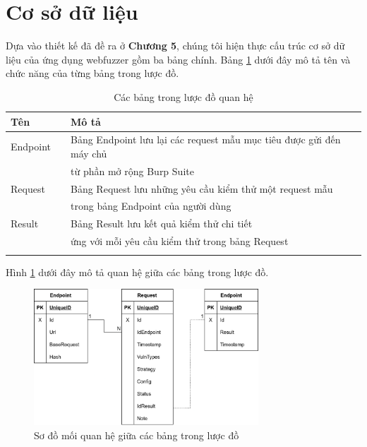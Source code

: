 \section{Cơ sở dữ liệu}
Dựa vào thiết kế đã đề ra ở \textbf{Chương 5}, chúng tôi hiện thực cấu trúc cơ sở dữ liệu của ứng dụng webfuzzer gồm ba bảng chính. Bảng \ref{tab:db-tables} dưới đây mô tả tên và chức năng của từng bảng trong lược đồ.
\begin{table}[ht]
    \centering
    \caption{Các bảng trong lược đồ quan hệ}
    \label{tab:db-tables}
    \begin{tabular}[ht]{lll}
        \toprule[1pt]\midrule[0.3pt]
            \textbf{Tên}& &\textbf{Mô tả}\\ 
        \midrule
            Endpoint& &Bảng Endpoint lưu lại các request mẫu mục tiêu được gửi đến máy chủ \\
            {}& &từ phần mở rộng Burp Suite\\
            \addlinespace
            Request& &Bảng Request lưu những yêu cầu kiểm thử một request mẫu \\
            {}& &trong bảng Endpoint của người dùng\\
            \addlinespace
            Result& &Bảng Result lưu kết quả kiểm thử chi tiết \\
            {}& &ứng với mỗi yêu cầu kiểm thử trong bảng Request\\
            \addlinespace
        \midrule[0.3pt]\bottomrule[1pt]
    \end{tabular}
\end{table}
\FloatBarrier
Hình \ref{fig:db-schema} dưới đây mô tả quan hệ giữa các bảng trong lược đồ.
\begin{figure}[H]
  \centering
    \includegraphics[width=0.75\textwidth,keepaspectratio=true]{images/database-design.png}
  \caption{Sơ đồ mối quan hệ giữa các bảng trong lược đồ}
  \label{fig:db-schema}
\end{figure}
